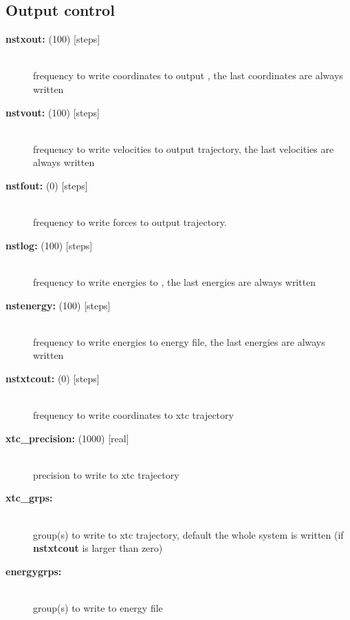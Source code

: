 \subsection{Output control}
\begin{description}
\item[{\bf nstxout: }(100) {[steps]}]\mbox{}\\
frequency to write coordinates to output 
, the last coordinates are always written
\item[{\bf nstvout: }(100) {[steps]}]\mbox{}\\
frequency  to write velocities to output trajectory,
the last velocities are always written
\item[{\bf nstfout: }(0) {[steps]}]\mbox{}\\
frequency to write forces to output trajectory.
\item[{\bf nstlog: }(100) {[steps]}]\mbox{}\\
frequency to write energies to ,
the last energies are always written
\item[{\bf nstenergy: }(100) {[steps]}]\mbox{}\\
frequency to write energies to energy file,
the last energies are always written
\item[{\bf nstxtcout: }(0) {[steps]}]\mbox{}\\
frequency to write coordinates to xtc trajectory
\item[{\bf xtc\_precision: }(1000) {[real]}]\mbox{}\\
precision to write to xtc trajectory
\item[{\bf xtc\_grps:}]\mbox{}\\
group(s) to write to xtc trajectory, default the whole system is written
(if {\bf nstxtcout} is larger than zero)  
\item[{\bf energygrps:}]\mbox{}\\
group(s) to write to energy file
\end{description}

